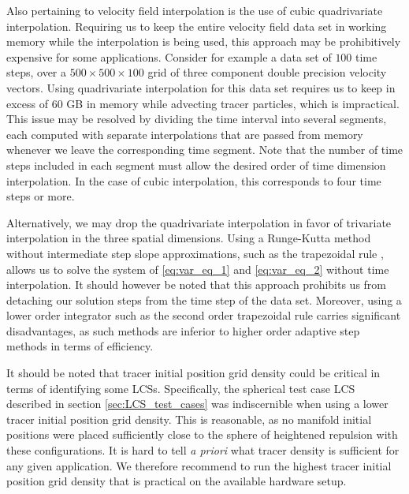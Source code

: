 Also pertaining to velocity field interpolation is the use of cubic quadrivariate interpolation. Requiring us to keep the entire velocity field data set in working memory while the interpolation is being used, this approach may be prohibitively expensive for some applications. Consider for example a data set of $100$ time steps, over a $500\times500\times100$ grid of three component double precision velocity vectors. Using quadrivariate interpolation for this data set requires us to keep in excess of 60 GB in memory while advecting tracer particles, which is impractical. This issue may be resolved by dividing the time interval into several segments, each computed with separate interpolations that are passed from memory whenever we leave the corresponding time segment. Note that the number of time steps included in each segment must allow the desired order of time dimension interpolation. In the case of cubic interpolation, this corresponds to four time steps or more. 

Alternatively, we may drop the quadrivariate interpolation in favor of trivariate interpolation in the three spatial dimensions. Using a Runge-Kutta method without intermediate step slope approximations, such as the trapezoidal rule \citep{SolvingODEs}, allows us to solve the system of \eqref{eq:var_eq_1} and \eqref{eq:var_eq_2} without time interpolation. It should however be noted that this approach prohibits us from detaching our solution steps from the time step of the data set. Moreover, using a lower order integrator such as the second order trapezoidal rule carries significant disadvantages, as such methods are inferior to higher order adaptive step methods in terms of efficiency. 


It should be noted that tracer initial position grid density could be critical in terms of identifying some LCSs. Specifically, the spherical test case LCS described in section \ref{sec:LCS_test_cases} was indiscernible when using a lower tracer initial position grid density. This is reasonable, as no manifold initial positions were placed sufficiently close to the sphere of heightened repulsion with these configurations. It is hard to tell \textit{a priori} what tracer density is sufficient for any given application. We therefore recommend to run the highest tracer initial position grid density that is practical on the available hardware setup.

